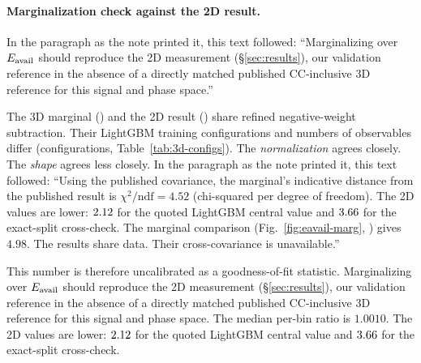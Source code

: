 
\paragraph{Marginalization check against the 2D result.} In the paragraph as the note printed it, this text followed: ``Marginalizing over $E_{\mathrm{avail}}$ should reproduce the 2D measurement (\S\ref{sec:results}), our validation reference in the absence of a directly matched published CC-inclusive 3D reference for this signal and phase space.''\par The 3D marginal (\estMultiD{}) and the 2D result (\estTwoD{}) share refined negative-weight subtraction. Their LightGBM training configurations and numbers of observables differ (configurations, Table~\ref{tab:3d-configs}). The \emph{normalization} agrees closely. The \emph{shape} agrees less closely. In the paragraph as the note printed it, this text followed: ``Using the published covariance, the marginal's indicative distance from the published result is $\chi^{2}/\mathrm{ndf}=4.52$ (chi-squared per degree of freedom). The 2D values are lower: $2.12$ for the quoted LightGBM central value and $3.66$ for the exact-split cross-check. The marginal comparison (Fig.~\ref{fig:eavail-marg}, \estPurity{}) gives $4.98$. The results share data. Their cross-covariance is unavailable.''\par This number is therefore uncalibrated as a goodness-of-fit statistic. Marginalizing over $E_{\mathrm{avail}}$ should reproduce the 2D measurement (\S\ref{sec:results}), our validation reference in the absence of a directly matched published CC-inclusive 3D reference for this signal and phase space. The median per-bin ratio is $1.0010$. The 2D values are lower: $2.12$ for the quoted LightGBM central value and $3.66$ for the exact-split cross-check.
